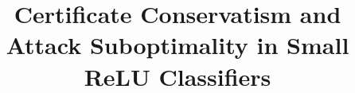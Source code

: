 \documentclass[sigconf,nonacm]{acmart}
\begin{document}

\title{Certificate Conservatism and Attack Suboptimality in Small ReLU Classifiers}

\begin{abstract}

\end{abstract}

\maketitle










\end{document}
